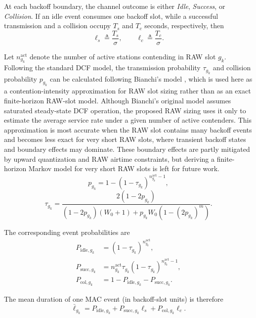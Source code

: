 \documentclass[journal]{IEEEtran}
\newcommand{\rev}[1]{{\color{blue}#1}}
\begin{document}
At each backoff boundary, the channel outcome is either \textit{Idle}, \textit{Success}, or \textit{Collision}. If an idle event consumes one backoff slot, while a successful transmission and a collision occupy $T_s$ and $T_c$ seconds, respectively, then
\begin{equation}
\ell_s \triangleq \frac{T_s}{\sigma},
\qquad
\ell_c \triangleq \frac{T_c}{\sigma}.
\end{equation}

Let $n_{g_k}^{\mathrm{act}}$ denote the number of active stations contending in RAW slot $g_k$. Following the standard DCF model, the transmission probability $\tau_{g_k}$ and collision probability $p_{g_k}$ can be calculated following Bianchi's model \cite{Bianchi2000DCF}, \rev{which is used here as a contention-intensity approximation for RAW slot sizing rather than as an exact finite-horizon RAW-slot model. Although Bianchi's original model assumes saturated steady-state DCF operation, the proposed RAW sizing uses it only to estimate the average service rate under a given number of active contenders. This approximation is most accurate when the RAW slot contains many backoff events and becomes less exact for very short RAW slots, where transient backoff states and boundary effects may dominate. These boundary effects are partly mitigated by upward quantization and RAW airtime constraints, but deriving a finite-horizon Markov model for very short RAW slots is left for future work.}
\begin{equation}
p_{g_k} = 1 - (1-\tau_{g_k})^{n_{g_k}^{\mathrm{act}}-1},
\label{eq:collision_prob}
\end{equation}
\begin{equation} \label{eq2}
\tau_{g_k} =
\frac{2(1-2p_{g_k})}
{(1-2p_{g_k})(W_0+1)+p_{g_k}W_0(1-(2p_{g_k})^m)}.
\end{equation}

The corresponding event probabilities are
\begin{align}
P_{\text{idle},g_k} &= (1-\tau_{g_k})^{n_{g_k}^{\mathrm{act}}},\\
P_{\text{succ},g_k} &= n_{g_k}^{\mathrm{act}}\tau_{g_k}(1-\tau_{g_k})^{n_{g_k}^{\mathrm{act}}-1},\\
P_{\text{col},g_k} &= 1 - P_{\text{idle},g_k} - P_{\text{succ},g_k}.
\end{align}

The mean duration of one MAC event (in backoff-slot units) is therefore
\begin{equation}
\bar{\ell}_{g_k}
=
P_{\text{idle},g_k}
+
P_{\text{succ},g_k}\ell_s
+
P_{\text{col},g_k}\ell_c.
\end{equation}
\end{document}
